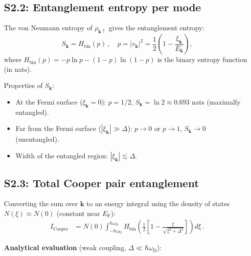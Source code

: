 \documentclass[prb,twocolumn,superscriptaddress,longbibliography,floatfix]{revtex4-2}
\newcommand{\Icoop}{I_{\mathrm{Cooper}}}
\newcommand{\oD}{\omega_{\mathrm{D}}}
\newcommand{\EF}{E_{\mathrm{F}}}
\newcommand{\Ek}{E_{\bm{k}}}
\newcommand{\xik}{\xi_{\bm{k}}}
\begin{document}
\subsection{S2.2: Entanglement entropy per mode}

The von Neumann entropy of $\rho_{\bm{k}\uparrow}$ gives the
entanglement entropy:
\begin{equation}\label{eq:S2_Sk}
  S_{\bm{k}} = H_{\mathrm{bin}}(p)\,,
  \quad p = |v_{\bm{k}}|^2 = \frac{1}{2}\left(1 - \frac{\xik}{\Ek}\right),
\end{equation}
where $H_{\mathrm{bin}}(p) = -p\ln p - (1-p)\ln(1-p)$ is the
binary entropy function (in nats).

Properties of $S_{\bm{k}}$:
\begin{itemize}
\item At the Fermi surface ($\xik = 0$): $p = 1/2$,
  $S_{\bm{k}} = \ln 2 \approx 0.693$ nats (maximally entangled).
\item Far from the Fermi surface ($|\xik| \gg \Delta$):
  $p \to 0$ or $p \to 1$, $S_{\bm{k}} \to 0$ (unentangled).
\item Width of the entangled region: $|\xik| \lesssim \Delta$.
\end{itemize}

\subsection{S2.3: Total Cooper pair entanglement}

Converting the sum over $\bm{k}$ to an energy integral using the
density of states $N(\xi) \approx N(0)$ (constant near $\EF$):
\begin{align}\label{eq:S2_Itotal}
  \Icoop &= N(0) \int_{-\hbar\oD}^{\hbar\oD}
  H_{\mathrm{bin}}\!\left(\frac{1}{2}\left[1-\frac{\xi}{\sqrt{\xi^2+\Delta^2}}\right]\right)
  d\xi\,.
\end{align}

\textbf{Analytical evaluation} (weak coupling, $\Delta \ll \hbar\oD$):
\end{document}
